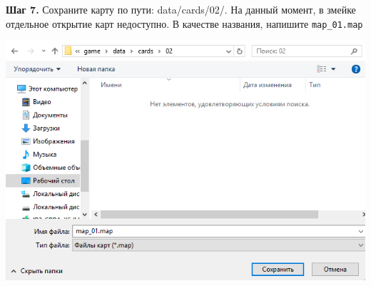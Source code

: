 \documentclass[a4paper,14pt]{extarticle}
\begin{document}
\textbf{Шаг 7.} Сохраните карту по пути: data/cards/02/. На данный момент, в змейке отдельное открытие карт недоступно. В качестве названия, напишите \verb|map_01.map|
\begin{center}
\includegraphics[scale=.9]{img18}
\end{center}
\end{document}
